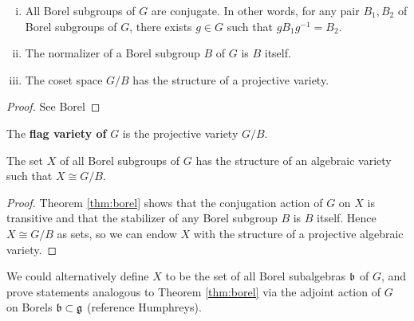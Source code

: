 \begin{theorem}\hspace{1mm}
    \begin{enumerate}[(i)]
        \item All Borel subgroups of $G$ are conjugate. In other words, for any pair
            $B_1,B_2$ of Borel subgroups of $G$, there exists $g\in G$ such that
            $gB_1g^{-1}=B_2$.
        \item The normalizer of a Borel subgroup $B$ of $G$ is $B$ itself.
        \item The coset space $G/B$ has the structure of a projective variety.
    \end{enumerate}
    \label{thm:borel}
\end{theorem}
\begin{proof}
    See Borel
\end{proof}

\begin{definition}
    The \textbf{flag variety of} $G$ is the projective variety $G/B$.
\end{definition}

\begin{proposition}
    The set $X$ of all Borel subgroups of $G$ has the structure of an algebraic
    variety such that $X\cong G/B$.
\end{proposition}
\begin{proof}
    Theorem \ref{thm:borel} shows that the conjugation action of $G$ on $X$ is transitive
    and that the stabilizer of any Borel subgroup $B$ is $B$ itself. Hence $X\cong G/B$ as
    sets, so we can endow $X$ with the structure of a projective algebraic variety.
\end{proof}

\begin{remark}
    We could alternatively define $X$ to be the set of all Borel subalgebras $\mathfrak b$ of $G$,
    and prove statements analogous to
    Theorem \ref{thm:borel}
    via the adjoint action of $G$ on Borels $\mathfrak b\subset\mathfrak g$ (reference Humphreys).
\end{remark}

